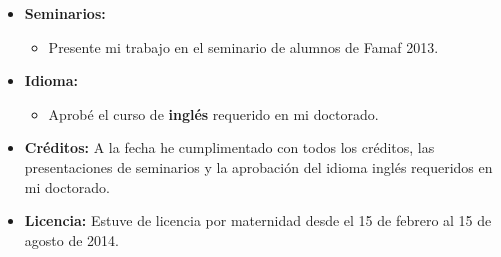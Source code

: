 \begin{itemize}
\item \textbf{Seminarios:}
\begin{itemize}
\item Presente mi trabajo en el seminario de alumnos de Famaf 2013.
\end{itemize}
\item \textbf{Idioma:}
\begin{itemize}
\item Aprob\'e el curso de \textbf{ingl\'es} requerido en mi doctorado.


\end{itemize}

\item  \textbf{Cr\'editos:} 
A la fecha he cumplimentado con todos los cr\'editos, las presentaciones de seminarios y la aprobaci\'on del idioma ingl\'es requeridos en mi doctorado.

\item  \textbf{Licencia:}
Estuve de licencia por maternidad desde el 15 de febrero al 15 de agosto de 2014. 

\end{itemize}




